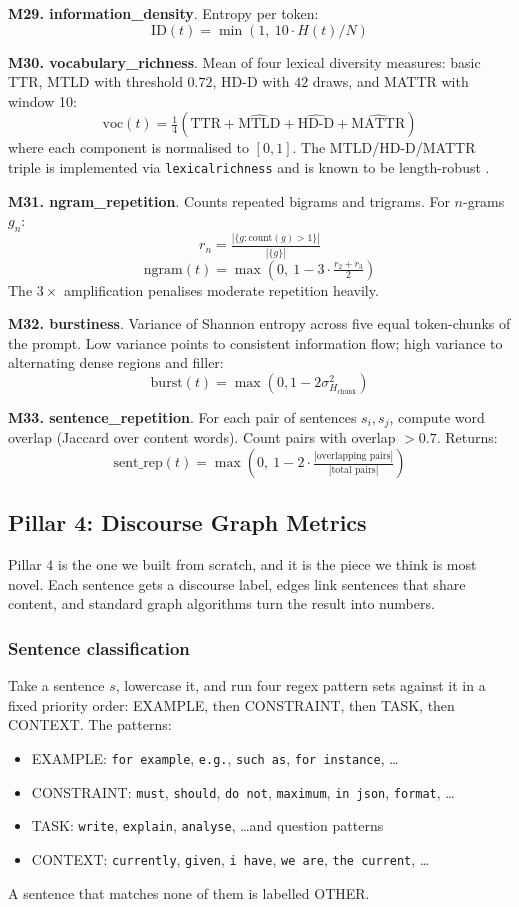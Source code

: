 \documentclass[conference]{IEEEtran}
\begin{document}
\textbf{M29. information\_density}. Entropy per token:
\[ \mathrm{ID}(t) = \min(1,\ 10 \cdot H(t) / N) \]

\textbf{M30. vocabulary\_richness}. Mean of four lexical diversity measures: basic TTR, MTLD with threshold $0.72$, HD-D with $42$ draws, and MATTR with window 10:
\[ \mathrm{voc}(t) = \tfrac{1}{4}(\mathrm{TTR} + \widehat{\mathrm{MTLD}} + \widehat{\mathrm{HD\text{-}D}} + \widehat{\mathrm{MATTR}}) \]
where each component is normalised to $[0, 1]$. The MTLD/HD-D/MATTR triple is implemented via \texttt{lexicalrichness} and is known to be length-robust \cite{mtld}.

\textbf{M31. ngram\_repetition}. Counts repeated bigrams and trigrams. For $n$-grams $g_n$:
\[ r_n = \tfrac{|\{g : \mathrm{count}(g) > 1\}|}{|\{g\}|} \]
\[ \mathrm{ngram}(t) = \max(0,\ 1 - 3 \cdot \tfrac{r_2 + r_3}{2}) \]
The $3 \times$ amplification penalises moderate repetition heavily.

\textbf{M32. burstiness}. Variance of Shannon entropy across five equal token-chunks of the prompt. Low variance points to consistent information flow; high variance to alternating dense regions and filler:
\[ \mathrm{burst}(t) = \max(0, 1 - 2 \sigma^2_{H_{\text{chunk}}}) \]

\textbf{M33. sentence\_repetition}. For each pair of sentences $s_i, s_j$, compute word overlap (Jaccard over content words). Count pairs with overlap $> 0.7$. Returns:
\[ \mathrm{sent\_rep}(t) = \max(0,\ 1 - 2 \cdot \tfrac{|\text{overlapping pairs}|}{|\text{total pairs}|}) \]

\subsection{Pillar 4: Discourse Graph Metrics}

Pillar 4 is the one we built from scratch, and it is the piece we think is most novel. Each sentence gets a discourse label, edges link sentences that share content, and standard graph algorithms turn the result into numbers.

\subsubsection{Sentence classification}
Take a sentence $s$, lowercase it, and run four regex pattern sets against it in a fixed priority order: EXAMPLE, then CONSTRAINT, then TASK, then CONTEXT. The patterns:
\begin{itemize}
\item EXAMPLE: \texttt{for example}, \texttt{e.g.}, \texttt{such as}, \texttt{for instance}, \ldots
\item CONSTRAINT: \texttt{must}, \texttt{should}, \texttt{do not}, \texttt{maximum}, \texttt{in json}, \texttt{format}, \ldots
\item TASK: \texttt{write}, \texttt{explain}, \texttt{analyse}, \ldots and question patterns
\item CONTEXT: \texttt{currently}, \texttt{given}, \texttt{i have}, \texttt{we are}, \texttt{the current}, \ldots
\end{itemize}
A sentence that matches none of them is labelled OTHER.
\end{document}
